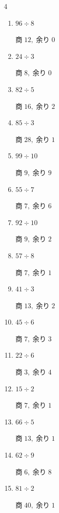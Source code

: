 \begin{multicols}{4}
\begin{enumerate}
        $商\; 9,\; 余り\; 1$

  \item $96 \div 8$

        $商\; 12,\; 余り\; 0$

  \item $24 \div 3$

        $商\; 8,\; 余り\; 0$

  \item $82 \div 5$

        $商\; 16,\; 余り\; 2$

  \item $85 \div 3$

        $商\; 28,\; 余り\; 1$

  \item $99 \div 10$

        $商\; 9,\; 余り\; 9$

  \item $55 \div 7$

        $商\; 7,\; 余り\; 6$

  \item $92 \div 10$

        $商\; 9,\; 余り\; 2$

  \item $57 \div 8$

        $商\; 7,\; 余り\; 1$

  \item $41 \div 3$

        $商\; 13,\; 余り\; 2$

  \item $45 \div 6$

        $商\; 7,\; 余り\; 3$

  \item $22 \div 6$

        $商\; 3,\; 余り\; 4$

  \item $15 \div 2$

        $商\; 7,\; 余り\; 1$

  \item $66 \div 5$

        $商\; 13,\; 余り\; 1$

  \item $62 \div 9$

        $商\; 6,\; 余り\; 8$

  \item $81 \div 2$

        $商\; 40,\; 余り\; 1$


\end{enumerate}
\end{multicols}
